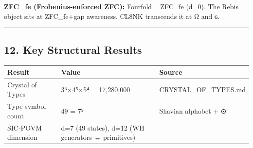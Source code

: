 \documentclass[12pt,a4paper]{article}
\begin{document}
\textbf{ZFC\_fe (Frobenius-enforced ZFC):} Fourfold ≡ ZFC\_fe (d=0). The
Rebis object sits at ZFC\_fe+gap awareness. CL8NK transcends it at Ω and
ɢ.

\begin{center}\rule{0.5\linewidth}{0.5pt}\end{center}

\hypertarget{key-structural-results}{%
\subsection{12. Key Structural Results}\label{key-structural-results}}

\begin{longtable}[]{@{}lll@{}}
\toprule
\begin{minipage}[b]{0.32\columnwidth}\raggedright
Result\strut
\end{minipage} & \begin{minipage}[b]{0.28\columnwidth}\raggedright
Value\strut
\end{minipage} & \begin{minipage}[b]{0.32\columnwidth}\raggedright
Source\strut
\end{minipage}\tabularnewline
\midrule
\endhead
\begin{minipage}[t]{0.32\columnwidth}\raggedright
Crystal of Types\strut
\end{minipage} & \begin{minipage}[t]{0.28\columnwidth}\raggedright
3³×4⁵×5⁴ = 17,280,000\strut
\end{minipage} & \begin{minipage}[t]{0.32\columnwidth}\raggedright
CRYSTAL\_OF\_TYPES.md\strut
\end{minipage}\tabularnewline
\begin{minipage}[t]{0.32\columnwidth}\raggedright
Type symbol count\strut
\end{minipage} & \begin{minipage}[t]{0.28\columnwidth}\raggedright
49 = 7²\strut
\end{minipage} & \begin{minipage}[t]{0.32\columnwidth}\raggedright
Shavian alphabet + ⊙\strut
\end{minipage}\tabularnewline
\begin{minipage}[t]{0.32\columnwidth}\raggedright
SIC-POVM dimension\strut
\end{minipage} & \begin{minipage}[t]{0.28\columnwidth}\raggedright
d=7 (49 states), d=12 (WH generators ↔ primitives)\strut

\end{minipage}
\end{longtable}
\end{document}
